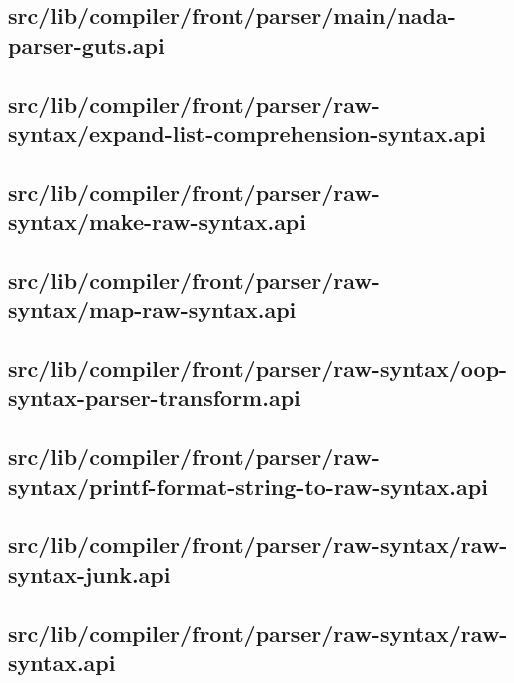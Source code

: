 \subsection{src/lib/compiler/front/parser/main/nada-parser-guts.api}


\subsection{src/lib/compiler/front/parser/raw-syntax/expand-list-comprehension-syntax.api}


\subsection{src/lib/compiler/front/parser/raw-syntax/make-raw-syntax.api}


\subsection{src/lib/compiler/front/parser/raw-syntax/map-raw-syntax.api}


\subsection{src/lib/compiler/front/parser/raw-syntax/oop-syntax-parser-transform.api}


\subsection{src/lib/compiler/front/parser/raw-syntax/printf-format-string-to-raw-syntax.api}


\subsection{src/lib/compiler/front/parser/raw-syntax/raw-syntax-junk.api}


\subsection{src/lib/compiler/front/parser/raw-syntax/raw-syntax.api}


